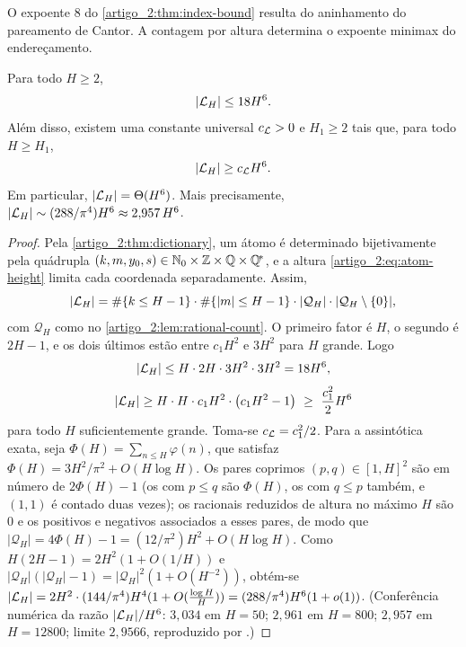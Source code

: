 O expoente $8$ do \cref{artigo_2:thm:index-bound} resulta do aninhamento do pareamento de Cantor. A contagem por altura determina o expoente minimax do endereçamento.

\begin{lemma}\label{map:artigo_2:3.2}\label{artigo_2:lem:atom-count}
Para todo $H\ge2$,
\begin{equation}
 |\mathcal{L}_H|\le18H^6.
 \label{artigo_2:eq:atom-count-upper}
\end{equation}
Além disso, existem uma constante universal $c_{\mathcal{L}}>0$ e $H_1\ge2$ tais
que, para todo $H\ge H_1$,
\begin{equation}
 |\mathcal{L}_H|\ge c_{\mathcal{L}} H^6.
 \label{artigo_2:eq:atom-count}
\end{equation}
Em particular, $|\mathcal{L}_H|=\Theta(H^6)$. Mais precisamente, $|\mathcal{L}_H|\sim(288/\pi^4)H^6\approx2{,}957\,H^6$.
\end{lemma}

\begin{proof}
Pela \cref{artigo_2:thm:dictionary}, um átomo é determinado bijetivamente pela quádrupla $(k,m,y_0,s)\in\mathbb{N}_0\times\mathbb{Z}\times\mathbb{Q}\times\mathbb{Q}^{\!*}$, e a altura \eqref{artigo_2:eq:atom-height} limita cada coordenada separadamente. Assim,
\[
 |\mathcal{L}_H|=\#\{k\le H-1\}\cdot\#\{|m|\le H-1\}\cdot|\mathcal{Q}_H|\cdot|\mathcal{Q}_H\setminus\{0\}|,
\]
com $\mathcal{Q}_H$ como no \cref{artigo_2:lem:rational-count}. O primeiro fator é $H$, o segundo é $2H-1$, e os dois últimos estão entre $c_1H^2$ e $3H^2$ para $H$ grande. Logo
\[
 |\mathcal{L}_H|\le H\cdot 2H\cdot 3H^2\cdot 3H^2=18H^6,
\]
\[
 |\mathcal{L}_H|\ge H\cdot H\cdot c_1H^2\cdot\bigl(c_1H^2-1\bigr)\ \ge\ \frac{c_1^2}{2}H^6
\]
para todo $H$ suficientemente grande. Toma-se $c_{\mathcal{L}}=c_1^2/2$. Para a assintótica exata, seja $\Phi(H)=\sum_{n\le H}\varphi(n)$, que satisfaz $\Phi(H)=3H^2/\pi^2+O(H\log H)$. Os pares coprimos $(p,q)\in[1,H]^2$ são em número de $2\Phi(H)-1$ (os com $p\le q$ são $\Phi(H)$, os com $q\le p$ também, e $(1,1)$ é contado duas vezes); os racionais reduzidos de altura no máximo $H$ são $0$ e os positivos e negativos associados a esses pares, de modo que $|\mathcal Q_H|=4\Phi(H)-1=(12/\pi^2)H^2+O(H\log H)$. Como $H(2H-1)=2H^2(1+O(1/H))$ e $|\mathcal Q_H|(|\mathcal Q_H|-1)=|\mathcal Q_H|^2(1+O(H^{-2}))$, obtém-se $|\mathcal{L}_H|=2H^2\cdot(144/\pi^4)H^4(1+O(\tfrac{\log H}{H}))=(288/\pi^4)H^6(1+o(1))$. (Conferência numérica da razão $|\mathcal{L}_H|/H^6$: $3{,}034$ em $H=50$; $2{,}961$ em $H=800$; $2{,}957$ em $H=12800$; limite $2{,}9566$, reproduzido por .)
\end{proof}

